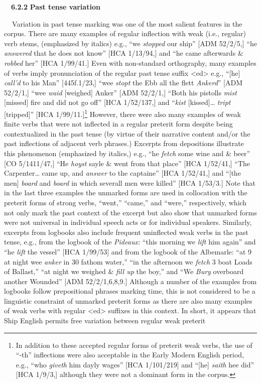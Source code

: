\begin{styleStandard}
\ \ \textbf{6.2.2} \textbf{Past tense variation }
\end{styleStandard}

\begin{styleStandard}
\textbf{\ \ }Variation in past tense marking was one of the most salient features in the corpus. There are many examples of regular inflection with weak (i.e., regular) verb stems, (emphasized by italics) e.g., “we \textit{stopped} our ship” [ADM 52/2/5,] “he \textit{answered} that he does not know” [HCA 1/13/94,] and “he came afterwards \&\textit{ robbed} her” [HCA 1/99/41.] Even with non-standard orthography, many examples of verbs imply pronunciation of the regular past tense suffix {\textless}ed{\textgreater} e.g., “[he] \textit{call’d} to his Man” [445f.1/23,] “wee \textit{stopt} the Ebb all the flett \textit{Ankerd}” [ADM 52/2/1,] “wee \textit{waid} [weighed] Anker” [ADM 52/2/1,] “Both his pistolls \textit{mist} [missed] fire and did not go off” [HCA 1/52/137,] and “\textit{kist} [kissed]… \textit{tript} [tripped]” [HCA 1/99/11.]\footnote{ In addition to these accepted regular forms of preterit weak verbs, the use of “-th” inflections were also acceptable in the Early Modern English period, e.g., “who \textit{giveth} him dayly wages” [HCA 1/101/219] and “[he] \textit{saith} hee did” [HCA 1/9/3,] although they were not a dominant form in the corpus.} However, there were also many examples of weak finite verbs that were not inflected in a regular preterit form despite being contextualized in the past tense (by virtue of their narrative content and/or the past inflections of adjacent verb phrases.) Excerpts from depositions illustrate this phenomenon (emphasized by italics,) e.g., “he \textit{fetch} some wine and \& beer” [CO 5/1411/47,] “He \textit{hoyst }sayle \& went from that place” [HCA 1/52/41,] “The Carpenter… came up, and \textit{answer} to the captaine” [HCA 1/52/41,] and “[the men] \textit{board} and\textit{ board} in which severall men were killed” [HCA 1/53/3.] Note that in the last three examples the unmarked forms are used in collocation with the preterit forms of strong verbs, “went,” “came,” and “were,” respectively, which not only mark the past context of the excerpt but also show that unmarked forms were not universal in individual speech acts or for individual speakers. Similarly, excerpts from logbooks also include frequent uninflected weak verbs in the past tense, e.g., from the logbook of the \textit{Pideaux: }“this morning we\textit{ lift} him again” and “he \textit{lift} the vessel” [HCA 1/99/53] and from the logbook of the Albemarle: “at 9 at night wee \textit{anker }in 30 fathom water,” “in the afternoon we \textit{fetch} 3 boat Loads of Ballast,” “at night we weighed \& \textit{fill up} the boy,” and “We\textit{ Bury} overboard another Wounded” [ADM 52/2/1,6,8,9.] Although a number of the examples from logbooks follow prepositional phrases marking time, this is not considered to be a linguistic constraint of unmarked preterit forms as there are also many examples of weak verbs with regular {\textless}ed{\textgreater} suffixes in this context. In short, it appears that Ship English permits free variation between regular weak preterit 
\end{styleStandard}
